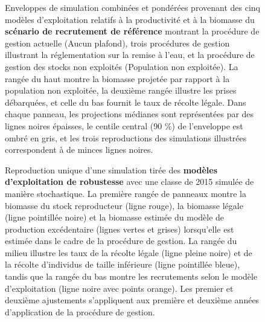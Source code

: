 \documentclass[11pt]{book}
\begin{document}
\begin{landscape}
\begin{figure}[htb]
{}

\caption{Enveloppes de simulation combinées et pondérées provenant des cinq modèles d’exploitation relatifs à la productivité et à la biomasse du \textbf{scénario de recrutement de référence} montrant la procédure de gestion actuelle (Aucun plafond), trois procédures de gestion illustrant la réglementation sur la remise à l’eau, et la procédure de gestion des stocks non exploités (Population non exploitée). La rangée du haut montre la biomasse projetée par rapport à la population non exploitée, la deuxième rangée illustre les prises débarquées, et celle du bas fournit le taux de récolte légale. Dans chaque panneau, les projections médianes sont représentées par des lignes noires épaisses, le centile central (90 \%) de l’enveloppe est ombré en gris, et les trois reproductions des simulations illustrées correspondent à de minces lignes noires.}\label{fig:unnamed-chunk-24}
\end{figure}
\newpage
\begin{figure}[htb]

{\centering {} 

}

\caption{Reproduction unique d’une simulation tirée des \textbf{modèles d’exploitation de robustesse} avec une classe de 2015 simulée de manière stochastique. La première rangée de panneaux montre la biomasse du stock reproducteur (ligne rouge), la biomasse légale (ligne pointillée noire) et la biomasse estimée du modèle de production excédentaire (lignes vertes et grises) lorsqu’elle est estimée dans le cadre de la procédure de gestion. La rangée du milieu illustre les taux de la récolte légale (ligne pleine noire) et de la récolte d’individus de taille inférieure (ligne pointillée bleue), tandis que la rangée du bas montre les recrutements selon le modèle d’exploitation (ligne noire avec points orange). Les premier et deuxième ajustements s’appliquent aux première et deuxième années d’application de la procédure de gestion.}\label{fig:unnamed-chunk-25}
\end{figure}
\newpage
\begin{figure}[htb]


\end{figure}
\end{landscape}
\end{document}
